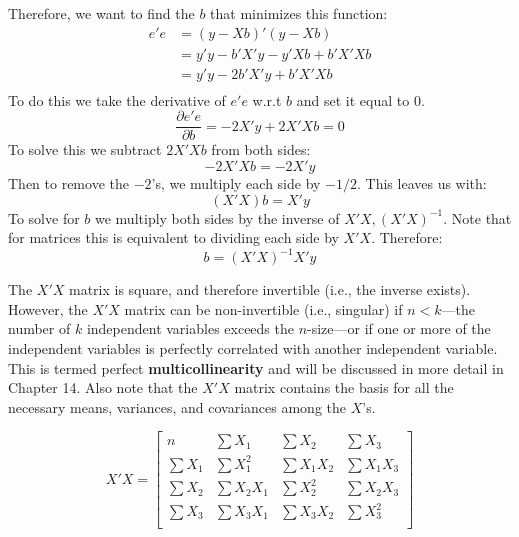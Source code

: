 \documentclass[11pt,openany]{book}\usepackage[]{graphicx}\usepackage[]{color}
\begin{document}
{Therefore, we want to find the $b$ that minimizes this function: 
\begin{align*}
e'e &= (y-Xb)'(y-Xb) \\
&=y'y-b'X'y-y'Xb+b'X'Xb \\
&=y'y-2b'X'y+b'X'Xb \\
\end{align*}
\noindent To do this we take the derivative of $e'e$
w.r.t $b$ and set it equal to $0$.
\begin{equation*}
\frac{\partial e'e}{\partial b}=-2X'y+2X'Xb=0   
\end{equation*}
\noindent To solve this we subtract $2X'Xb$ from both sides:
\begin{equation*}
  -2X'Xb=-2X'y
\end{equation*}
\noindent Then to remove the $-2$'s, we multiply each side by
$-1/2$. This leaves us with: 
\begin{equation*}
(X'X)b=X'y  
\end{equation*}
\noindent  To solve for $b$ we multiply both sides by the inverse of $X'X, (X'X)^{-1}$. Note that for matrices this is equivalent to dividing each side by $X'X$. Therefore:
\begin{equation}
  \label{eq:b}
b = (X'X)^{-1}X'y  
\end{equation}

The $X'X$ matrix is square, and therefore invertible (i.e., the inverse exists). However, the $X'X$ matrix can be non-invertible (i.e., singular) if $n < k$---the number of $k$ independent variables exceeds the $n$-size---or if one or more of the independent variables is perfectly correlated with another independent variable. This is termed perfect \textbf{multicollinearity} and will be discussed in more detail in Chapter 14. Also note that the $X'X$ matrix contains the basis for all the necessary means, variances, and covariances among the $X$'s.     

\begin{equation*}
X'X =
\begin{bmatrix}
  n & \sum X_1 & \sum X_2 & \sum X_3 \\
  \sum X_1 & \sum X^{2}_1 & \sum X_1X_2 & \sum X_1X_3 \\
  \sum X_2 & \sum X_2X_1 & \sum X^{2}_2 & \sum X_2X_3 \\
  \sum X_3 & \sum X_3X_1 & \sum X_3X_2 & \sum X^{2}_3 \\ 
\end{bmatrix}
\end{equation*}

}
\end{document}
